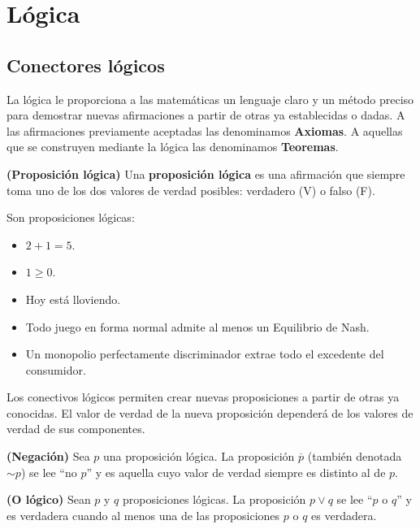 
\section{Lógica}

\subsection{Conectores lógicos}

La lógica le proporciona a las matemáticas un lenguaje claro y un método preciso para demostrar nuevas afirmaciones a partir de otras ya establecidas o dadas. A las afirmaciones previamente aceptadas las denominamos \textbf{Axiomas}. A aquellas que se construyen mediante la lógica las denominamos \textbf{Teoremas}. 

\begin{definicion}
	\textbf{(Proposición lógica)}
	Una \textbf{proposición lógica} es una afirmación que siempre toma uno de los dos valores de verdad posibles: verdadero (V) o falso (F). 
\end{definicion}

\begin{ejemplo}
	Son proposiciones lógicas: 
	\begin{itemize}
		\item $2+1 = 5$. 
		\item $1 \geq 0$.
		\item Hoy está lloviendo. 
		\item Todo juego en forma normal admite al menos un Equilibrio de Nash.   
		\item Un monopolio perfectamente discriminador extrae todo el excedente del consumidor. 
	\end{itemize}
\end{ejemplo}

Los conectivos lógicos permiten crear nuevas proposiciones a partir de otras ya conocidas. El valor de verdad de la nueva proposición dependerá de los valores de verdad de sus componentes. 

\begin{definicion}
	\textbf{(Negación)} 
	Sea $p$ una proposición lógica. La proposición $\overline{p}$ (también denotada $\sim p$) se lee ``no $p$'' y es aquella cuyo valor de verdad siempre es distinto al de $p$. 
\end{definicion}

\begin{definicion}
	\textbf{(O lógico)}	
	Sean $p$ y $q$ proposiciones lógicas. La proposición $p \vee q$ se lee ``$p$ o $q$'' y es verdadera cuando al menos una de las proposiciones $p$ o $q$ es verdadera. 
\end{definicion}

